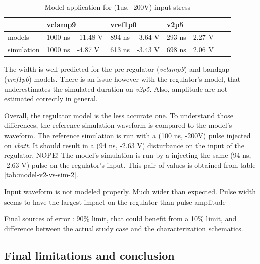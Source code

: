 \begin{table}[!h]
\centering
\begin{tabular}{@{}lllllllll@{}}
           & \multicolumn{2}{l}{vclamp9}            & \multicolumn{2}{l}{vref1p0} & \multicolumn{2}{l}{v2p5} \\
\toprule
models     & 1000 ns & \textcolor{red!90}{-11.48 V} & 894 ns       & -3.64 V      & \textcolor{red!90}{293 ns}  & 2.27 V     \\
simulation & 1000 ns & -4.87 V                      & 613 ns       & -3.43 V      & 698 ns                      & 2.06 V
\end{tabular}
\caption{Model application for (1us, -200V) input stress}
\label{tab:model-v2-vs-sim-3}
\end{table}

The width is well predicted for the pre-regulator (\textit{vclamp9}) and bandgap (\textit{vref1p0}) models.
There is an issue however with the regulator's model, that underestimates the simulated duration on \textit{v2p5}.
Also, amplitude are not estimated correctly in general.

Overall, the regulator model is the less accurate one.
To understand those differences, the reference simulation waveform is compared to the model's waveform.
The reference simulation is run with a (100 ns, -200V) pulse injected on \textit{vbatt}.
It should result in a (94 ns, -2.63 V) disturbance on the input of the regulator. NOPE!
The model's simulation is run by a injecting the same (94 ns, -2.63 V) pulse on the regulator's input.
This pair of values is obtained from table \ref{tab:model-v2-vs-sim-2}.



Input waveform is not modeled properly. Much wider than expected.
Pulse width seems to have the largest impact on the regulator than pulse amplitude

Final sources of error : 90\% limit, that could benefit from a 10\% limit, and difference between the actual study case and the characterization schematics.

\subsection{Final limitations and conclusion}

